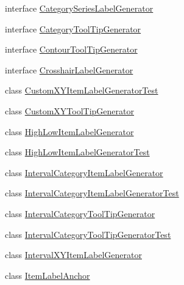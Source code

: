 \begin{DoxyCompactItemize}
interface \mbox{\hyperlink{interfaceorg_1_1jfree_1_1chart_1_1labels_1_1_category_series_label_generator}{Category\+Series\+Label\+Generator}}
\item 
interface \mbox{\hyperlink{interfaceorg_1_1jfree_1_1chart_1_1labels_1_1_category_tool_tip_generator}{Category\+Tool\+Tip\+Generator}}
\item 
interface \mbox{\hyperlink{interfaceorg_1_1jfree_1_1chart_1_1labels_1_1_contour_tool_tip_generator}{Contour\+Tool\+Tip\+Generator}}
\item 
interface \mbox{\hyperlink{interfaceorg_1_1jfree_1_1chart_1_1labels_1_1_crosshair_label_generator}{Crosshair\+Label\+Generator}}
\item 
class \mbox{\hyperlink{classorg_1_1jfree_1_1chart_1_1labels_1_1_custom_x_y_item_label_generator_test}{Custom\+X\+Y\+Item\+Label\+Generator\+Test}}
\item 
class \mbox{\hyperlink{classorg_1_1jfree_1_1chart_1_1labels_1_1_custom_x_y_tool_tip_generator}{Custom\+X\+Y\+Tool\+Tip\+Generator}}
\item 
class \mbox{\hyperlink{classorg_1_1jfree_1_1chart_1_1labels_1_1_high_low_item_label_generator}{High\+Low\+Item\+Label\+Generator}}
\item 
class \mbox{\hyperlink{classorg_1_1jfree_1_1chart_1_1labels_1_1_high_low_item_label_generator_test}{High\+Low\+Item\+Label\+Generator\+Test}}
\item 
class \mbox{\hyperlink{classorg_1_1jfree_1_1chart_1_1labels_1_1_interval_category_item_label_generator}{Interval\+Category\+Item\+Label\+Generator}}
\item 
class \mbox{\hyperlink{classorg_1_1jfree_1_1chart_1_1labels_1_1_interval_category_item_label_generator_test}{Interval\+Category\+Item\+Label\+Generator\+Test}}
\item 
class \mbox{\hyperlink{classorg_1_1jfree_1_1chart_1_1labels_1_1_interval_category_tool_tip_generator}{Interval\+Category\+Tool\+Tip\+Generator}}
\item 
class \mbox{\hyperlink{classorg_1_1jfree_1_1chart_1_1labels_1_1_interval_category_tool_tip_generator_test}{Interval\+Category\+Tool\+Tip\+Generator\+Test}}
\item 
class \mbox{\hyperlink{classorg_1_1jfree_1_1chart_1_1labels_1_1_interval_x_y_item_label_generator}{Interval\+X\+Y\+Item\+Label\+Generator}}
\item 
class \mbox{\hyperlink{classorg_1_1jfree_1_1chart_1_1labels_1_1_item_label_anchor}{Item\+Label\+Anchor}}
\item 

\end{DoxyCompactItemize}
